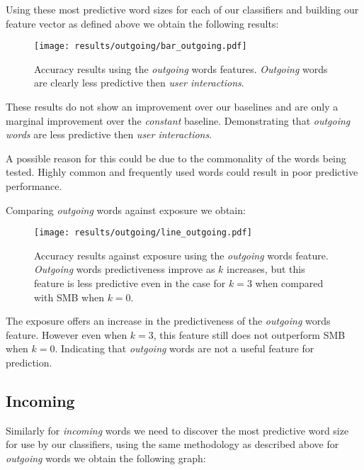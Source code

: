 Using these most predictive word sizes for each of our classifiers and building our feature vector as defined above we obtain the following results:

\begin{figure}[h]
	\begin{center}
		\texttt{[image: results/outgoing/bar\_outgoing.pdf]}
		\caption{Accuracy results using the \emph{outgoing} words features. \emph{Outgoing} words are clearly less predictive then \emph{user interactions}.}
	\end{center}
\end{figure}

These results do not show an improvement over our baselines and are only a marginal improvement over the \emph{constant} baseline. 
Demonstrating that \emph{outgoing words} are less predictive then \emph{user interactions}.

A possible reason for this could be due to the commonality of the words being tested. Highly common and frequently used words could 
result in poor predictive performance.

\clearpage

Comparing \emph{outgoing} words against exposure we obtain:

\begin{figure}[h]
	\begin{center}
		\texttt{[image: results/outgoing/line\_outgoing.pdf]}
		\caption{Accuracy results against exposure using the \emph{outgoing} words feature. \emph{Outgoing} words predictiveness improve as $k$ increases, but this feature is less predictive
				 even in the case for $k=3$ when compared with SMB when $k=0$.}
	\end{center}
\end{figure}

The exposure offers an increase in the predictiveness of the \emph{outgoing} words feature. However even when $k=3$, this feature still does 
not outperform SMB when $k=0$. Indicating that \emph{outgoing} words are not a useful feature for prediction.

\subsection{Incoming}
\label{sec:id}

Similarly for \emph{incoming} words we need to discover the most predictive word size for use by our classifiers, 
using the same methodology as described above for \emph{outgoing} words we obtain the following graph:

